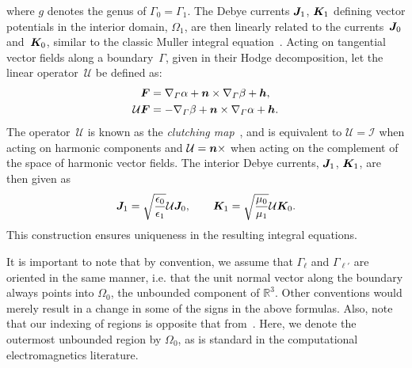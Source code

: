 \documentclass[11pt]{article}
\newcommand{\vct}{\vectorsym}
\newcommand{\surfgrad}{\nabla_\Gamma}
\newcommand{\bbR}{\mathbb R}
\newcommand{\bn}{\vct{ n}}
\newcommand{\bF}{\vct{ F}}
\newcommand{\bJ}{\vct{ J}}
\newcommand{\bK}{\vct{ K}}
\newcommand{\cI}{\mathcal I}
\newcommand{\cU}{\mathcal U}
\newcommand\bh{\vct{h}}
\numberwithin{equation}{section}
\begin{document}
where $g$ denotes the genus of $\Gamma_0 = \Gamma_1$.  The Debye
currents $\bJ_1$, $\bK_1$ defining vector potentials in the interior
domain, $\Omega_1$, are then linearly related to the currents~$\bJ_0$
and~$\bK_0$, similar to the classic Muller integral
equation~\cite{muller}. Acting on tangential vector fields
along a boundary~$\Gamma$, given in their Hodge decomposition, 
let the linear operator~$\cU$ be defined as:
\begin{equation}
  \begin{aligned}
    \bF &= \surfgrad \alpha + \bn \times \surfgrad \beta + \bh, \\
    \cU\bF &= -\surfgrad \beta + \bn \times \surfgrad \alpha + \bh.
  \end{aligned}
\end{equation}
The operator~$\cU$ is known as
the \emph{clutching map}~\cite{EpGrOn}, and is equivalent to
$\cU = \cI$ when acting on harmonic components and $\cU = \bn \times$
when acting on the complement of the space of harmonic vector fields.
The interior Debye currents, $\bJ_1$, $\bK_1$, are then given as
\begin{equation}
\bJ_1 = \sqrt{\frac{\epsilon_0}{\epsilon_1}} \cU \bJ_0, \qquad
\bK_1 = \sqrt{\frac{\mu_0}{\mu_1}} \cU \bK_0.
\end{equation}
This construction ensures uniqueness
in the resulting integral equations.


It is important to note that by convention, we assume that
$\Gamma_\ell$ and $\Gamma_{\ell'}$ are oriented in the same manner,
i.e. that the unit normal vector along the boundary always points into
$\Omega_0$, the unbounded component of $\bbR^3$. Other conventions
would merely result in a change in some of the signs in the above
formulas. Also, note that our indexing of regions is opposite that
from~\cite{EpGrOn}. Here, we denote the outermost unbounded
region by $\Omega_0$, as is standard in the computational
electromagnetics literature.
\end{document}

